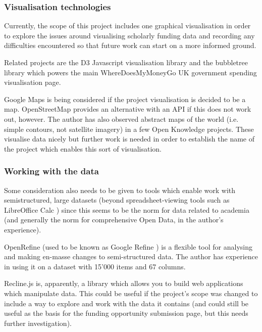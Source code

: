 \documentclass[11pt,fleqn,twoside]{article}
\begin{document}
\subsubsection{Visualisation technologies}
Currently, the scope of this project includes one graphical visualisation in order to explore the issues around visualising scholarly funding data and recording any difficulties encountered so that future work can start on a more informed ground.

Related projects are the D3 \cite{d3} Javascript visualisation library and the bubbletree \cite{bubbletree} library which powers the main WhereDoesMyMoneyGo \cite{wdmmg} UK government spending visualisation page.

Google Maps \cite{gmaps} is being considered if the project visualisation is decided to be a map. OpenStreetMap \cite{osm} provides an alternative with an API if this does not work out, however. The author has also observed abstract maps of the world (i.e. simple contours, not satellite imagery) in a few Open Knowledge projects. These visualise data nicely but further work is needed in order to establish the name of the project which enables this sort of visualisation.

\subsubsection{Working with the data}
Some consideration also needs to be given to tools which enable work with semistructured, large datasets (beyond spreadsheet-viewing tools such as LibreOffice Calc \cite{calc}) since this seems to be the norm for data related to academia (and generally the norm for comprehensive Open Data, in the author's experience).

OpenRefine \cite{orefine} (used to be known as Google Refine \cite{grefine}) is a flexible tool for analysing and making en-masse changes to semi-structured data. The author has experience in using it on a dataset with 15'000 items and 67 columns.

Recline.js \cite{recline} is, apparently, a library which allows you to build web applications which manipulate data. This could be useful if the project's scope was changed to include a way to explore and work with the data it contains (and could still be useful as the basis for the funding opportunity submission page, but this needs further investigation).
\end{document}

